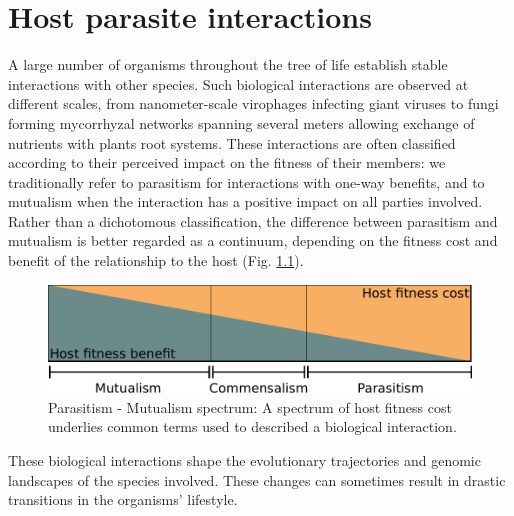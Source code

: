 
\chapter{Host parasite interactions} %

\label{ch:01-01} %


A large number of organisms throughout the tree of life establish stable interactions with other species. Such biological interactions are observed at different scales, from nanometer-scale virophages infecting giant viruses to fungi forming mycorrhyzal networks spanning several meters \citep{johnsonFunctioningMycorrhizalAssociations1997,selosseMycorrhizalNetworksLiaisons2006} allowing exchange of nutrients with plants root systems. These interactions are often classified according to their perceived impact on the \Gls{fitness} of their members: we traditionally refer to parasitism for interactions with one-way benefits, and to mutualism when the interaction has a positive impact on all parties involved. Rather than a dichotomous classification, the difference between parasitism and mutualism is better regarded as a continuum, depending on the fitness cost and benefit of the relationship to the host (Fig. \ref{fig:01-01:mutualism}).

\begin{figure}[b]
    \includegraphics[width=\textwidth]{Parts/Part01/gfx/parasitism_mutualism.pdf}
    \caption[Parasitism - Mutualism spectrum.]{Parasitism - Mutualism spectrum: A spectrum of host fitness cost underlies common terms used to described a biological interaction.}
	\label{fig:01-01:mutualism}
\end{figure}


These biological interactions shape the evolutionary trajectories and genomic landscapes of the species involved. These changes can sometimes result in drastic transitions in the organisms' lifestyle. 

